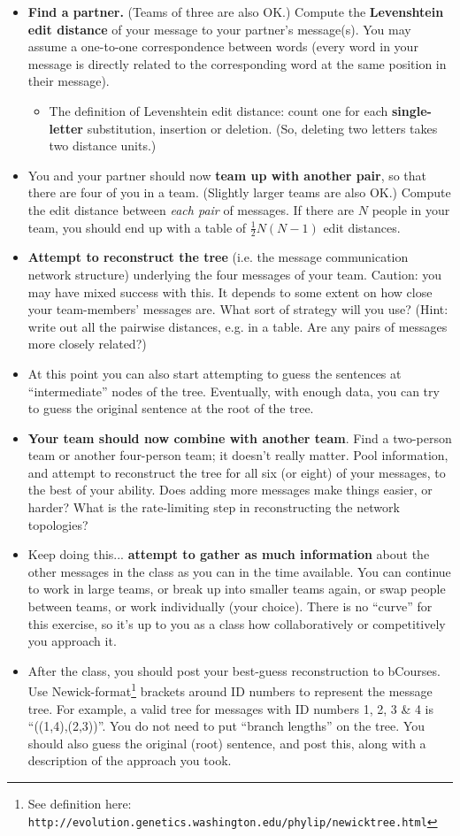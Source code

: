 \documentclass[10pt,letterpaper,english]{article}
\begin{document}
{\begin{itemize}
\item {\bf Find a partner.} (Teams of three are also OK.) Compute the {\bf Levenshtein edit distance} of your message to your partner's message(s).
You may assume a one-to-one correspondence between words (every word in your message is directly related to the corresponding word at the same position in their message).
\begin{itemize}
\item The definition of Levenshtein edit distance: count one for each {\bf single-letter} substitution, insertion or deletion.
(So, deleting two letters takes two distance units.)
\end{itemize}
\item You and your partner should now {\bf team up with another pair}, so that there are four of you in a team.
(Slightly larger teams are also OK.) Compute the edit distance between {\em each pair} of messages.
If there are $N$ people in your team, you should end up with a table of $\frac{1}{2}N(N-1)$ edit distances.
\item {\bf Attempt to reconstruct the tree} (i.e. the message communication network structure) underlying the four messages of your team.
Caution: you may have mixed success with this. It depends to some extent on how close your team-members' messages are.
What sort of strategy will you use? (Hint: write out all the pairwise distances, e.g. in a table. Are any pairs of messages more closely related?)
\item At this point you can also start attempting to guess the sentences at ``intermediate'' nodes of the tree.
Eventually, with enough data, you can try to guess the original sentence at the root of the tree.
\item {\bf Your team should now combine with another team}. Find a two-person team or another four-person team; it doesn't really matter.
Pool information, and attempt to reconstruct the tree for all six (or eight) of your messages, to the best of your ability.
Does adding more messages make things easier, or harder? What is the rate-limiting step in reconstructing the network topologies?
\item Keep doing this... {\bf attempt to gather as much information} about the other messages in the class as you can in the time available.
You can continue to work in large teams, or break up into smaller teams again, or swap people between teams, or work individually (your choice).
There is no ``curve'' for this exercise, so it's up to you as a class how collaboratively or competitively you approach it.
\item After the class, you should post your best-guess reconstruction to bCourses.
Use Newick-format\footnote[1]{See definition here: {\tt http://evolution.genetics.washington.edu/phylip/newicktree.html}}
brackets around ID numbers to represent the message tree.
For example, a valid tree for messages with ID numbers 1, 2, 3 \& 4
is ``((1,4),(2,3))''.
You do not need to put ``branch lengths'' on the tree.
You should also guess the original (root) sentence, and post this, along with a description of the approach you took.
\end{itemize}
}

\generatepages
\end{document}
